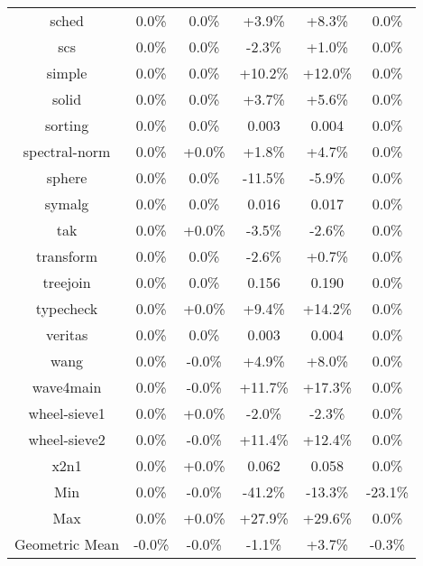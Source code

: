 \begin{tabular}{ c c c c c c }
sched &  0.0\% &  0.0\% & +3.9\% & +8.3\% &  0.0\%\\
scs &  0.0\% &  0.0\% & -2.3\% & +1.0\% &  0.0\%\\
simple &  0.0\% &  0.0\% & +10.2\% & +12.0\% &  0.0\%\\
solid &  0.0\% &  0.0\% & +3.7\% & +5.6\% &  0.0\%\\
sorting &  0.0\% &  0.0\% & 0.003 & 0.004 &  0.0\%\\
spectral-norm &  0.0\% & +0.0\% & +1.8\% & +4.7\% &  0.0\%\\
sphere &  0.0\% &  0.0\% & -11.5\% & -5.9\% &  0.0\%\\
symalg &  0.0\% &  0.0\% & 0.016 & 0.017 &  0.0\%\\
tak &  0.0\% & +0.0\% & -3.5\% & -2.6\% &  0.0\%\\
transform &  0.0\% &  0.0\% & -2.6\% & +0.7\% &  0.0\%\\
treejoin &  0.0\% &  0.0\% & 0.156 & 0.190 &  0.0\%\\
typecheck &  0.0\% & +0.0\% & +9.4\% & +14.2\% &  0.0\%\\
veritas &  0.0\% &  0.0\% & 0.003 & 0.004 &  0.0\%\\
wang &  0.0\% & -0.0\% & +4.9\% & +8.0\% &  0.0\%\\
wave4main &  0.0\% & -0.0\% & +11.7\% & +17.3\% &  0.0\%\\
wheel-sieve1 &  0.0\% & +0.0\% & -2.0\% & -2.3\% &  0.0\%\\
wheel-sieve2 &  0.0\% & -0.0\% & +11.4\% & +12.4\% &  0.0\%\\
x2n1 &  0.0\% & +0.0\% & 0.062 & 0.058 &  0.0\%\\
\hline
Min &  0.0\% & -0.0\% & -41.2\% & -13.3\% & -23.1\%\\
Max &  0.0\% & +0.0\% & +27.9\% & +29.6\% &  0.0\%\\
Geometric Mean & -0.0\% & -0.0\% & -1.1\% & +3.7\% & -0.3\%\\


\end{tabular}
